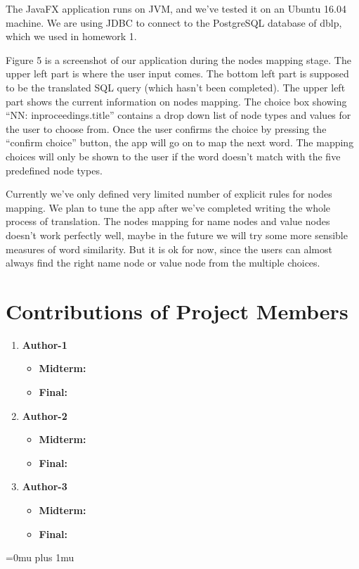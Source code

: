 \documentclass[twocolumn]{article}
\begin{document}
The JavaFX application runs on JVM, and we’ve tested it on an Ubuntu 16.04 machine. We are using JDBC to connect to the PostgreSQL database of dblp, which we used in homework 1.

Figure 5 is a screenshot of our application during the nodes mapping stage. The upper left part is where the user input comes. The bottom left part is supposed to be the translated SQL query (which hasn’t been completed). The upper left part shows the current information on nodes mapping. The choice box showing “NN: inproceedings.title” contains a drop down list of node types and values for the user to choose from. Once the user confirms the choice by pressing the “confirm choice” button, the app will go on to map the next word. The mapping choices will only be shown to the user if the word doesn’t match with the five predefined node types.

Currently we’ve only defined very limited number of explicit rules for nodes mapping. We plan to tune the app after we’ve completed writing the whole process of translation. The nodes mapping for name nodes and value nodes doesn’t work perfectly well, maybe in the future we will try some more sensible measures of word similarity. But it is ok for now, since the users can almost always find the right name node or value node from the multiple choices.

\section{Contributions of Project Members}

\begin{enumerate}
\item {\bf Author-1}
\begin{itemize}
\item {\bf Midterm:}
\item {\bf Final:}
\end{itemize}
\item {\bf Author-2}
\begin{itemize}
\item {\bf Midterm:}
\item {\bf Final:}
\end{itemize}
\item {\bf Author-3}
\begin{itemize}
\item {\bf Midterm:}
\item {\bf Final:}
\end{itemize}
\end{enumerate}

\Urlmuskip=0mu plus 1mu\relax


\end{document}

